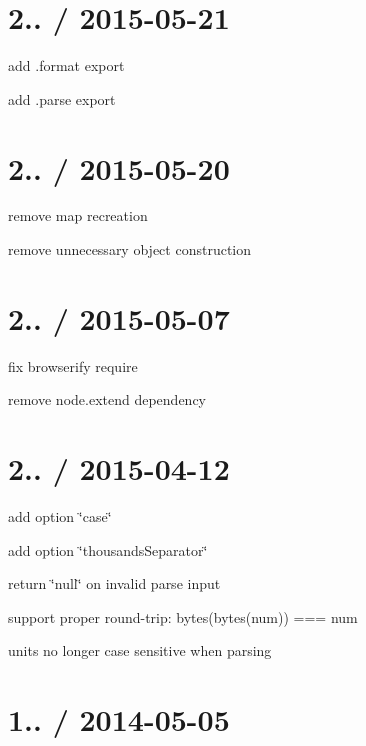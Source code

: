 \section*{2.. / 2015-\/05-\/21 }


\begin{DoxyItemize}
\item add {\ttfamily .format} export
\item add {\ttfamily .parse} export
\end{DoxyItemize}

\section*{2.. / 2015-\/05-\/20 }


\begin{DoxyItemize}
\item remove map recreation
\item remove unnecessary object construction
\end{DoxyItemize}

\section*{2.. / 2015-\/05-\/07 }


\begin{DoxyItemize}
\item fix browserify require
\item remove node.\+extend dependency
\end{DoxyItemize}

\section*{2.. / 2015-\/04-\/12 }


\begin{DoxyItemize}
\item add option \char`\"{}case\char`\"{}
\item add option \char`\"{}thousands\+Separator\char`\"{}
\item return \char`\"{}null\char`\"{} on invalid parse input
\item support proper round-\/trip\+: bytes(bytes(num)) === num
\item units no longer case sensitive when parsing
\end{DoxyItemize}

\section*{1.. / 2014-\/05-\/05 }


